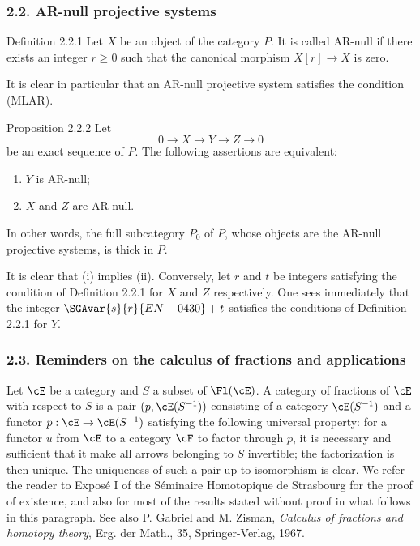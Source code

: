 \subsubsection*{2.2. AR-null projective systems}
\begin{statement}{Definition 2.2.1}
Let $X$ be an object of the category $P$. It is called AR-null if there exists an integer $r\ge0$ such that the canonical morphism $X[r]\to X$ is zero.
\end{statement}
It is clear in particular that an AR-null projective system satisfies the condition (MLAR).

\begin{statement}{Proposition 2.2.2}
Let
\[
0\longrightarrow X\longrightarrow Y\longrightarrow Z\longrightarrow0
\]
be an exact sequence of $P$. The following assertions are equivalent:
\begin{enumerate}[label=(\roman*)]
\item $Y$ is AR-null;
\item $X$ and $Z$ are AR-null.
\end{enumerate}
In other words, the full subcategory $P_0$ of $P$, whose objects are the AR-null projective systems, is thick in $P$.
\end{statement}

\begin{prooftext}[Proof]
It is clear that (i) implies (ii). Conversely, let $r$ and $t$ be integers satisfying the condition of Definition 2.2.1 for $X$ and $Z$ respectively. One sees immediately that the integer $\SGAvar{s}{r}{EN-0430}+t$ satisfies the conditions of Definition 2.2.1 for $Y$.
\end{prooftext}

\subsubsection*{2.3. Reminders on the calculus of fractions and applications}
Let $\cE$ be a category and $S$ a subset of $\Fl(\cE)$. A category of fractions of $\cE$ with respect to $S$ is a pair $(p,\cE(S^{-1}))$ consisting of a category $\cE(S^{-1})$ and a functor $p:\cE\to\cE(S^{-1})$ satisfying the following universal property: for a functor $u$ from $\cE$ to a category $\cF$ to factor through $p$, it is necessary and sufficient that it make all arrows belonging to $S$ invertible; the factorization is then unique. The uniqueness of such a pair up to isomorphism is clear. We refer the reader to Exposé I of the Séminaire Homotopique de Strasbourg for the proof of existence, and also for most of the results stated without proof in what follows in this paragraph. See also P. Gabriel and M. Zisman, \emph{Calculus of fractions and homotopy theory}, Erg. der Math., 35, Springer-Verlag, 1967.

